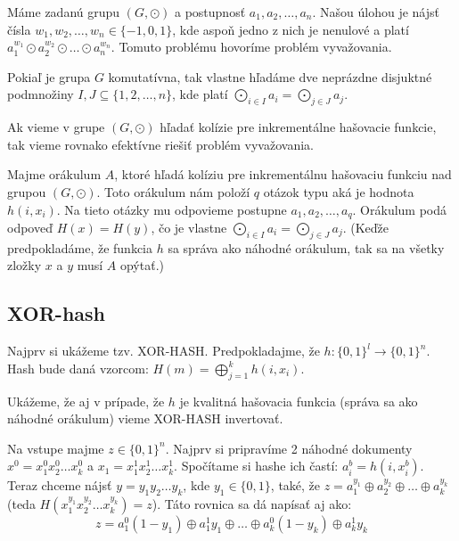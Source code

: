 \begin{definicia}
Máme zadanú grupu $(G, \odot)$ a postupnosť $a_1, a_2, \dots, a_n$. Našou úlohou
je nájsť čísla $w_1, w_2, \dots, w_n \in \{-1, 0, 1\}$, kde aspoň jedno z nich
je nenulové a platí $a_1^{w_1} \odot a_2^{w_2} \odot \dots \odot a_n^{w_n}$.
Tomuto problému hovoríme problém vyvažovania.
\end{definicia}

\begin{poznamka}
Pokiaľ je grupa $G$ komutatívna, tak vlastne hľadáme dve neprázdne disjuktné podmnožiny
$I, J \subseteq \{1, 2, \dots, n\}$, kde platí $\bigodot_{i\in I} a_i = \bigodot_{j \in J} a_j$.
\end{poznamka}

\begin{lema}
Ak vieme v grupe $(G, \odot)$ hľadať kolízie pre inkrementálne hašovacie
funkcie, tak vieme rovnako efektívne riešiť problém vyvažovania.
\end{lema}

\begin{dokaz}
Majme orákulum $A$, ktoré hľadá kolíziu pre inkrementálnu hašovaciu
funkciu nad grupou $(G, \odot)$. Toto orákulum nám položí $q$ otázok
typu aká je hodnota $h(i, x_i)$. Na tieto otázky mu odpovieme postupne $a_1, a_2, \dots, a_q$.
Orákulum podá odpoveď $H(x) = H(y)$, čo je vlastne $\bigodot_{i \in I} a_i = \bigodot_{j \in J} a_j$.
(Keďže predpokladáme, že funkcia $h$ sa správa ako náhodné orákulum, tak sa na všetky zložky
$x$ a $y$ musí $A$ opýtať.)
\end{dokaz}

\subsection{XOR-hash}

Najprv si ukážeme tzv. XOR-HASH.
Predpokladajme, že $h\colon \{0,1\}^l \to \{0,1\}^n$.
Hash bude daná vzorcom:
$H(m) = \displaystyle\bigoplus_{j=1}^k h(i, x_i)$.

Ukážeme, že aj v prípade, že $h$ je kvalitná hašovacia funkcia
(správa sa ako náhodné orákulum) vieme XOR-HASH invertovať.

Na vstupe majme $z \in \{0,1\}^n$. Najprv si pripravíme
2 náhodné dokumenty $x^0 = x_1^0 x_2^0 \dots x_k^0$ a 
$x_1 = x_1^1 x_2^1 \dots x_k^1$. Spočítame si hashe ich častí:
$a_i^b = h(i, x_i^b)$. 
Teraz chceme nájsť $y = y_1 y_2 \dots y_k$, kde $y_1 \in \{0,1\}$,
také, že $z = a_1^{y_1} \oplus a_2^{y_2} \oplus \dots \oplus a_k^{y_k}$
(teda $H(x_1^{y_1} x_2^{y_2} \dots x_k^{y_k}) = z$).
Táto rovnica sa dá napísať aj ako:
$$z = a_1^0 (1 - y_1) \oplus a_1^1 y_1 \oplus \dots \oplus a_k^0 (1 - y_k) \oplus a_k^1 y_k$$

